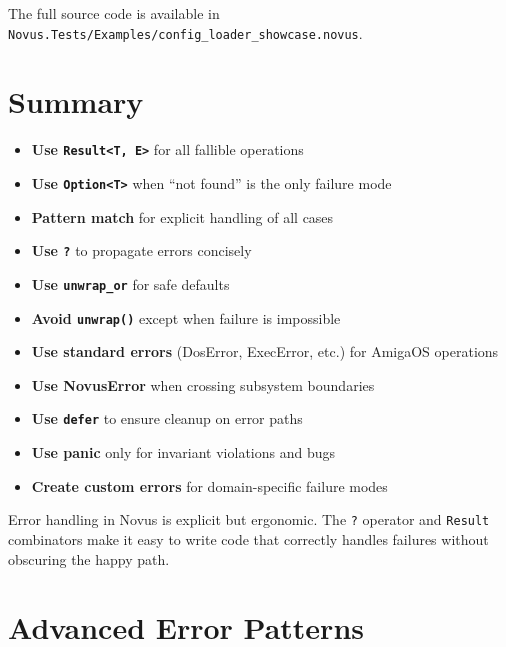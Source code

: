 The full source code is available in \texttt{Novus.Tests/Examples/config\_loader\_showcase.novus}.

\section{Summary}
\label{sec:error-summary}

\begin{itemize}
    \item \textbf{Use \texttt{Result<T, E>}} for all fallible operations
    \item \textbf{Use \texttt{Option<T>}} when ``not found'' is the only failure mode
    \item \textbf{Pattern match} for explicit handling of all cases
    \item \textbf{Use \texttt{?}} to propagate errors concisely
    \item \textbf{Use \texttt{unwrap\_or}} for safe defaults
    \item \textbf{Avoid \texttt{unwrap()}} except when failure is impossible
    \item \textbf{Use standard errors} (DosError, ExecError, etc.) for AmigaOS operations
    \item \textbf{Use NovusError} when crossing subsystem boundaries
    \item \textbf{Use \texttt{defer}} to ensure cleanup on error paths
    \item \textbf{Use panic} only for invariant violations and bugs
    \item \textbf{Create custom errors} for domain-specific failure modes
\end{itemize}

Error handling in Novus is explicit but ergonomic. The \texttt{?} operator and \texttt{Result} combinators make it easy to write code that correctly handles failures without obscuring the happy path.

\section{Advanced Error Patterns}
\label{sec:advanced-error-patterns}

